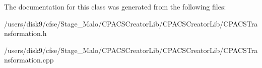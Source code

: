 The documentation for this class was generated from the following files\-:\begin{DoxyCompactItemize}
\item 
/users/disk9/cfse/\-Stage\-\_\-\-Malo/\-C\-P\-A\-C\-S\-Creator\-Lib/\-C\-P\-A\-C\-S\-Creator\-Lib/C\-P\-A\-C\-S\-Transformation.\-h\item 
/users/disk9/cfse/\-Stage\-\_\-\-Malo/\-C\-P\-A\-C\-S\-Creator\-Lib/\-C\-P\-A\-C\-S\-Creator\-Lib/C\-P\-A\-C\-S\-Transformation.\-cpp\end{DoxyCompactItemize}
